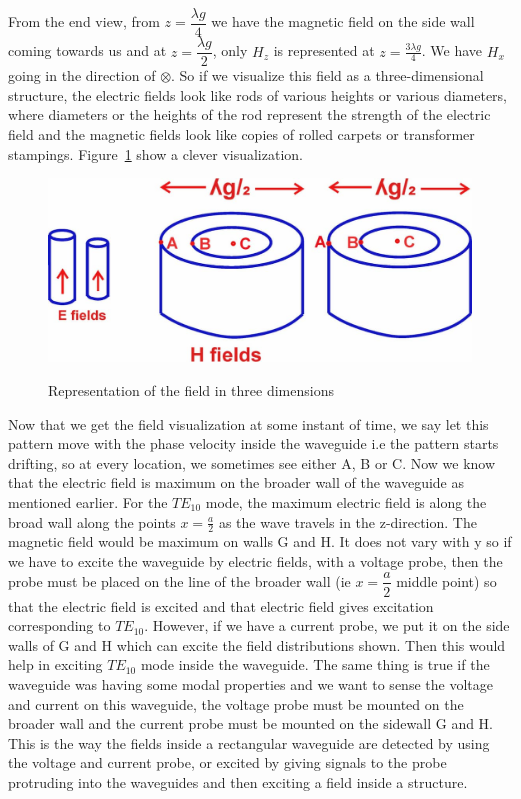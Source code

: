 From the end view, from $z=\dfrac{\lambda g}{4}$ we have the magnetic field on the side wall coming towards us and at $z=\dfrac{\lambda g}{2}$, only $H_{z}$ is represented at $z=\frac{3\lambda g}{4}$. We have $H_{x}$ going in the direction of $\otimes$. So if we visualize this field as a three-dimensional structure, the electric fields look like rods of various heights or various diameters, where diameters or the heights of the rod represent the strength of the electric field and the magnetic fields look like copies of rolled carpets or transformer stampings. Figure~\ref{fig:lectureimage4} show a clever visualization.
\begin{figure}[h]
\centering
\includegraphics[width=1\linewidth]{./graphics/lecture-image-4.jpg}
\label{fig:lectureimage4}
\caption{Representation of the field in three dimensions}
\end{figure}
	
Now that we get the field visualization at some instant of time, we say let this pattern move with the phase velocity inside the waveguide i.e the pattern starts drifting, so at every location, we sometimes see either A, B or C. Now we know that the electric field is maximum on the broader wall of the waveguide as mentioned earlier. For the $TE_{10}$ mode, the maximum electric field is along the broad wall along the points   $x = \frac{a}{2}$ as the wave travels in the z-direction. The magnetic field would be maximum on walls G and H. It does not vary with y so if we have to excite the waveguide by electric fields, with a voltage probe, then the probe must be placed on the line of the broader wall (ie $x = \dfrac{a}{2}$ middle point) so that the electric field is excited and that electric field gives excitation corresponding to $TE_{10}$. However, if we have a current probe, we put it on the side walls of G and H which can excite the field distributions shown. Then this would help in exciting $TE_{10}$ mode inside the waveguide. The same thing is true if the waveguide was having some modal properties and we want to sense the voltage and current on this waveguide, the voltage probe must be mounted on the broader wall and the current probe must be mounted on the sidewall G and H. This is the way the fields inside a rectangular waveguide are detected by using the voltage and current probe, or excited by giving signals to the probe protruding into the waveguides and then exciting a field inside a structure.

